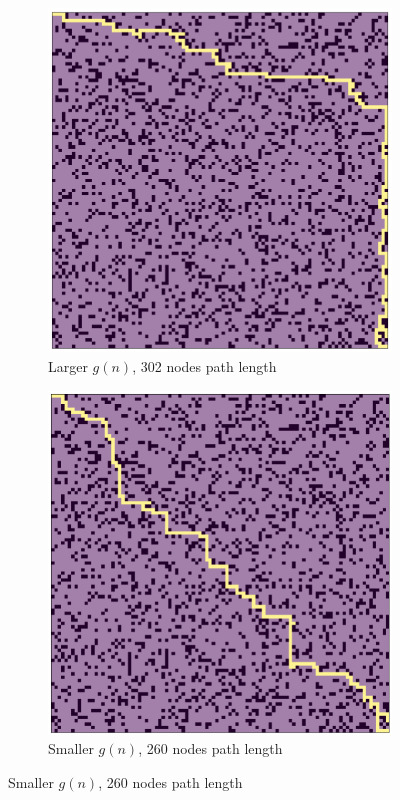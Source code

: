 \begin{figure}[ht]
\begin{subfigure}{.5\textwidth}
  \centering
  \includegraphics[width=0.8\linewidth]{Report/Part2/larger_g_forward_302.png}  
  \caption{Larger $g(n)$, 302 nodes path length}
\end{subfigure}
\begin{subfigure}{.5\textwidth}
  \centering
  \includegraphics[width=0.8\linewidth]{Report/Part2/smaller_g_forward_260.png}  
  \caption{Smaller $g(n)$, 260 nodes path length}
\end{subfigure}
\newline

\end{figure}

